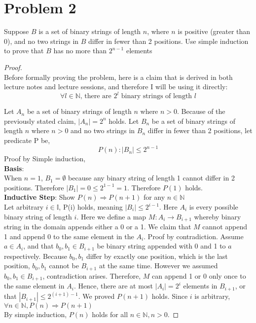 \documentclass[11pt]{article}
\theoremstyle{plain}%
\theoremstyle{definition}
\theoremstyle{remark}
\newcommand{\N}{\mathbb{N}}
\newcommand{\I}{\mathbb{I}}
\begin{document}
\section*{Problem 2}
Suppose $B$ is a set of binary strings of length $n$, where $n$ is positive (greater than $0$), and no two strings in $B$ differ in fewer than 2 positions. Use simple induction to prove that $B$ has no more than $2^{n-1}$ elements

\begin{proof}
  $ $\\
  Before formally proving the problem, here is a claim that is derived in both lecture notes and lecture sessions, and therefore I will be using it directly:
  \[
    \forall l\in \N \text{, there are } 2^l \text{ binary strings of length } l
  \]

  Let $A_n$ be a set of binary strings of length $n$ where $n > 0$. Because of the previously stated claim, $|A_n| = 2^n$ holds. Let $B_n$ be a set of binary strings of length $n$ where $n > 0$ and no two strings in $B_n$ differ in fewer than 2 positions, let predicate P be,
  \[
    P(n): |B_n| \leq 2^{n-1}
  \]
  Proof by Simple induction, \\
  \textbf{Basis}: \\
  When $n=1$, $B_1 = \emptyset$ because any binary string of length 1 cannot differ in 2 positions. Therefore $|B_1| = 0 \leq 2^{1-1} = 1$. Therefore $P(1)$ holds. \\
  \textbf{Inductive Step}: Show $P(n) \Rightarrow P(n+1)$ for any $n\in \N$ \\
  Let arbitrary $i\in\I$, P(i) holds, meaning $|B_i| \leq 2^{i-1}$. Here $A_i$ is every possible binary string of length $i$. Here we define a map $M: A_{i} \to B_{i+1}$ whereby binary string in the domain appends either a 0 or a 1. We claim that $M$ cannot append 1 and append 0 to the same element in the $A_i$. Proof by contradiction. Assume $a\in A_i$, and that $b_0, b_1 \in B_{i+1}$ be binary string appended with 0 and 1 to $a$ respectively. Because $b_0, b_1$ differ by exactly one position, which is the last position, $b_0,b_1$ cannot be $B_{i+1}$ at the same time. However we assumed $b_0, b_1 \in B_{i+1}$, contradiction arises. Therefore, $M$ can append 1 or 0 only once to the same element in $A_i$. Hence, there are at most $|A_i| = 2^{i}$ elements in $B_{i+1}$, or that $|B_{i+1}| \leq 2^{(i+1)-1}$. We proved $P(n+1)$ holds. Since $i$ is arbitrary, $\forall n\in\N, P(n) \Rightarrow P(n+1)$ \\

  By simple induction, $P(n)$ holds for all $n\in\N, n>0$.


\end{proof}
\end{document}
